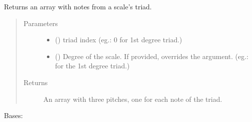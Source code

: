 \documentclass[letterpaper,10pt,english]{sphinxmanual}
\begin{document}
\begin{fulllineitems}
\begin{fulllineitems}
\begin{quote}
\begin{description}
\begin{itemize}
\end{itemize}

\end{description}\end{quote}

\end{fulllineitems}


\begin{fulllineitems}
\label{\detokenize{index:birdears.scale.DiatonicScale.get_triad}}
\sphinxAtStartPar
Returns an array with notes from a scale’s triad.
\begin{quote}\begin{description}
\item[{Parameters}] \leavevmode\begin{itemize}
\item {} 
\sphinxAtStartPar
{} () \textendash{} triad index (eg.: 0 for 1st degree triad.)

\item {} 
\sphinxAtStartPar
{} () \textendash{} Degree of the scale. If provided, overrides the
 argument. (eg.:  for the 1st degree triad.)

\end{itemize}

\item[{Returns}] \leavevmode
\sphinxAtStartPar
An array with three pitches, one for each note of the triad.

\end{description}\end{quote}

\end{fulllineitems}


\end{fulllineitems}


\begin{fulllineitems}
\label{\detokenize{index:birdears.scale.ScaleBase}}
\sphinxAtStartPar
Bases: 

\end{fulllineitems}
\end{document}
